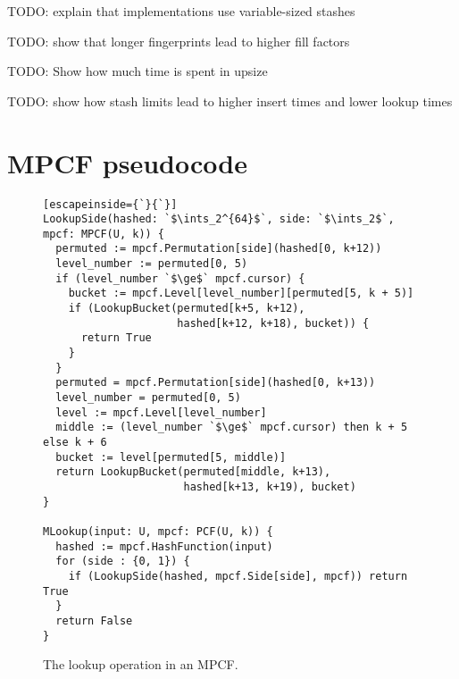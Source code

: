 \documentclass[letterpaper, 11pt]{article}
\newcommand{\ints}{\mathbb{Z}}
\begin{document}
TODO: explain that implementations use variable-sized stashes





TODO: show that longer fingerprints lead to higher fill factors


TODO: Show how much time is spent in upsize

TODO: show how stash limits lead to higher insert times and lower lookup times





\appendix
\section{MPCF pseudocode}

\begin{figure}
\begin{lstlisting}[escapeinside={`}{`}]
LookupSide(hashed: `$\ints_2^{64}$`, side: `$\ints_2$`, mpcf: MPCF(U, k)) {
  permuted := mpcf.Permutation[side](hashed[0, k+12))
  level_number := permuted[0, 5)
  if (level_number `$\ge$` mpcf.cursor) {
    bucket := mpcf.Level[level_number][permuted[5, k + 5)]
    if (LookupBucket(permuted[k+5, k+12),
                     hashed[k+12, k+18), bucket)) {
      return True
    }
  }
  permuted = mpcf.Permutation[side](hashed[0, k+13))
  level_number = permuted[0, 5)
  level := mpcf.Level[level_number]
  middle := (level_number `$\ge$` mpcf.cursor) then k + 5 else k + 6
  bucket := level[permuted[5, middle)]
  return LookupBucket(permuted[middle, k+13),
                      hashed[k+13, k+19), bucket)
}

MLookup(input: U, mpcf: PCF(U, k)) {
  hashed := mpcf.HashFunction(input)
  for (side : {0, 1}) {
    if (LookupSide(hashed, mpcf.Side[side], mpcf)) return True
  }
  return False
}
\end{lstlisting}
\caption{The lookup operation in an MPCF.}
\end{figure}
\end{document}
